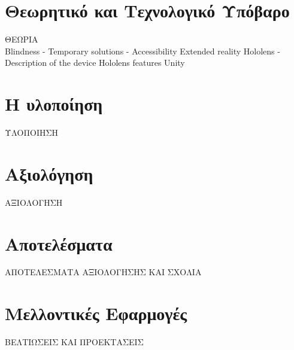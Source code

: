 \documentclass[a4paper,11pt,twoside]{book}
\author{\me}
\begin{document}
\setcounter{page}{3}



\clearemptydoublepage



\clearemptydoublepage



\clearemptydoublepage



\clearemptydoublepage



\clearemptydoublepage

\pagestyle{fancy}

\tableofcontents
\clearemptydoublepage
\listoffigures
\clearemptydoublepage
\listoftables
\clearemptydoublepage


\setcounter{page}{1}


\clearemptydoublepage

\chapter{Θεωρητικό και Τεχνολογικό Υπόβαρο}\label{ch:chap2}
{\LARGE ΘΕΩΡΙΑ}\\
Blindness
- Temporary solutions
- Accessibility
Extended reality
Hololens
- Description of the device
Hololens features
Unity

\clearemptydoublepage

\chapter{Η υλοποίηση}\label{ch:chap3}
{\LARGE ΥΛΟΠΟΙΗΣΗ}\\


\clearemptydoublepage

\chapter{Αξιολόγηση}\label{ch:chap4}
{\LARGE ΑΞΙΟΛΟΓΗΣΗ}\\
\clearemptydoublepage

\chapter{Αποτελέσματα}\label{ch:chap5}
{\LARGE ΑΠΟΤΕΛΕΣΜΑΤΑ ΑΞΙΟΛΟΓΗΣΗΣ ΚΑΙ ΣΧΟΛΙΑ}\\
\clearemptydoublepage

\chapter{Μελλοντικές Εφαρμογές}\label{ch:chap6}
{\LARGE ΒΕΛΤΙΩΣΕΙΣ ΚΑΙ ΠΡΟΕΚΤΑΣΕΙΣ}\\


\clearemptydoublepage


\end{document}
